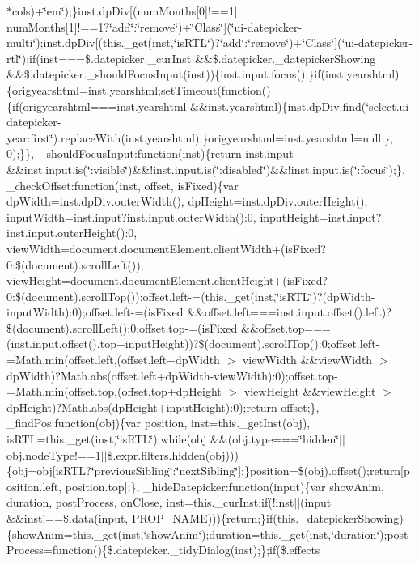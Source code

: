{{\begin{DoxyParamCaption}
$\ast$cols)+\char`\"{}em\char`\"{});\}inst.\+dp\+Div\mbox{[}(num\+Months\mbox{[}0\mbox{]}!==1$\vert$$\vert$num\+Months\mbox{[}1\mbox{]}!==1?\char`\"{}add\char`\"{}\+:\char`\"{}remove\char`\"{})+\char`\"{}\+Class\char`\"{}\mbox{]}(\char`\"{}ui-\/datepicker-\/multi\char`\"{});inst.\+dp\+Div\mbox{[}(this.\+\_\+get(inst,\char`\"{}is\+R\+T\+L\char`\"{})?\char`\"{}add\char`\"{}\+:\char`\"{}remove\char`\"{})+\char`\"{}\+Class\char`\"{}\mbox{]}(\char`\"{}ui-\/datepicker-\/rtl\char`\"{});if(inst===\$.\+datepicker.\+\_\+cur\+Inst \&\&\$.\+datepicker.\+\_\+datepicker\+Showing \&\&\$.\+datepicker.\+\_\+should\+Focus\+Input(inst))\{inst.\+input.\+focus();\}if(inst.\+yearshtml)\{origyearshtml=inst.\+yearshtml;set\+Timeout(function()\{if(origyearshtml===inst.\+yearshtml \&\&inst.\+yearshtml)\{inst.\+dp\+Div.\+find(\char`\"{}select.\+ui-\/datepicker-\/year\+:first\char`\"{}).\+replace\+With(inst.\+yearshtml);\}origyearshtml=inst.\+yearshtml=null;\}, 0);\}\}, \+\_\+should\+Focus\+Input\+:function(inst)\{return inst.\+input \&\&inst.\+input.\+is(\char`\"{}\+:visible\char`\"{})\&\&!inst.\+input.\+is(\char`\"{}\+:disabled\char`\"{})\&\&!inst.\+input.\+is(\char`\"{}\+:focus\char`\"{});\}, \+\_\+check\+Offset\+:function(inst, offset, is\+Fixed)\{var dp\+Width=inst.\+dp\+Div.\+outer\+Width(), dp\+Height=inst.\+dp\+Div.\+outer\+Height(), input\+Width=inst.\+input?inst.\+input.\+outer\+Width()\+:0, input\+Height=inst.\+input?inst.\+input.\+outer\+Height()\+:0, view\+Width=document.\+document\+Element.\+client\+Width+(is\+Fixed?0\+:\$(document).\+scroll\+Left()), view\+Height=document.\+document\+Element.\+client\+Height+(is\+Fixed?0\+:\$(document).\+scroll\+Top());offset.\+left-\/=(this.\+\_\+get(inst,\char`\"{}is\+R\+T\+L\char`\"{})?(dp\+Width-\/input\+Width)\+:0);offset.\+left-\/=(is\+Fixed \&\&offset.\+left===inst.\+input.\+offset().\+left)?\$(document).\+scroll\+Left()\+:0;offset.\+top-\/=(is\+Fixed \&\&offset.\+top===(inst.\+input.\+offset().\+top+input\+Height))?\$(document).\+scroll\+Top()\+:0;offset.\+left-\/=\+Math.\+min(offset.\+left,(offset.\+left+dp\+Width $>$ view\+Width \&\&view\+Width $>$ dp\+Width)?\+Math.\+abs(offset.\+left+dp\+Width-\/view\+Width)\+:0);offset.\+top-\/=\+Math.\+min(offset.\+top,(offset.\+top+dp\+Height $>$ view\+Height \&\&view\+Height $>$ dp\+Height)?\+Math.\+abs(dp\+Height+input\+Height)\+:0);return offset;\}, \+\_\+find\+Pos\+:function(obj)\{var position, inst=this.\+\_\+get\+Inst(obj), is\+R\+T\+L=this.\+\_\+get(inst,\char`\"{}is\+R\+T\+L\char`\"{});while(obj \&\&(obj.\+type===\char`\"{}hidden\char`\"{}$\vert$$\vert$obj.\+node\+Type!==1$\vert$$\vert$\$.\+expr.\+filters.\+hidden(obj)))\{obj=obj\mbox{[}is\+R\+T\+L?\char`\"{}previous\+Sibling\char`\"{}\+:\char`\"{}next\+Sibling\char`\"{}\mbox{]};\}position=\$(obj).\+offset();return\mbox{[}position.\+left, position.\+top\mbox{]};\}, \+\_\+hide\+Datepicker\+:function(input)\{var show\+Anim, duration, post\+Process, on\+Close, inst=this.\+\_\+cur\+Inst;if(!inst$\vert$$\vert$(input \&\&inst!==\$.\+data(input, P\+R\+O\+P\+\_\+\+N\+A\+M\+E)))\{return;\}if(this.\+\_\+datepicker\+Showing)\{show\+Anim=this.\+\_\+get(inst,\char`\"{}show\+Anim\char`\"{});duration=this.\+\_\+get(inst,\char`\"{}duration\char`\"{});post\+Process=function()\{\$.\+datepicker.\+\_\+tidy\+Dialog(inst);\};if(\$.\+effects 
\end{DoxyParamCaption}}}

